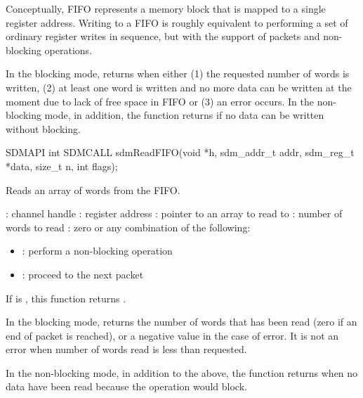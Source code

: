 \documentclass[a4paper,12pt,twoside,extrafontsizes]{memoir}
\begin{document}
\begin{funcremarks}
	Conceptually, FIFO represents a memory block that is mapped to a single register address. Writing to a FIFO is roughly equivalent to performing a set of ordinary register writes in sequence, but with the support of packets and non-blocking operations.
	
	In the blocking mode,  returns when either (1) the requested number of words is written, (2) at least one word is written and no more data can be written at the moment due to lack of free space in FIFO or (3) an error occurs. In the non-blocking mode, in addition, the function returns if no data can be written without blocking.
\end{funcremarks}



\begin{cfuncprototype}
SDMAPI int SDMCALL sdmReadFIFO(void *h, sdm_addr_t addr, sdm_reg_t *data, size_t n, int flags);
\end{cfuncprototype}

\begin{funcdescr}
	Reads an array of words from the FIFO.
\end{funcdescr}

\begin{funcparams}
	: channel handle
	: register address
	: pointer to an array to read to
	: number of words to read
	: zero or any combination of the following:
		\begin{itemize}
			\item{}: perform a non-blocking operation
			\item{}: proceed to the next packet
		\end{itemize}
\end{funcparams}

\begin{funcret}
	If  is , this function returns .
	
	In the blocking mode, returns the number of words that has been read (zero if an end of packet is reached), or a negative value in the case of error. It is not an error when number of words read is less than requested.
	
	In the non-blocking mode, in addition to the above, the function returns  when no data have been read because the operation would block.
\end{funcret}
\end{document}
